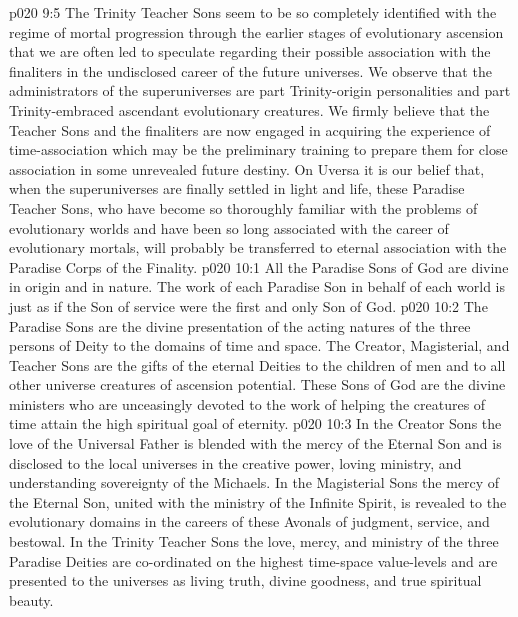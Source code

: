 \pc \vs p020 9:5 The Trinity Teacher Sons seem to be so completely identified with the regime of mortal progression through the earlier stages of evolutionary ascension that we are often led to speculate regarding their possible association with the finaliters in the undisclosed career of the future universes. We observe that the administrators of the superuniverses are part Trinity\hyp{}origin personalities and part Trinity\hyp{}embraced ascendant evolutionary creatures. We firmly believe that the Teacher Sons and the finaliters are now engaged in acquiring the experience of time\hyp{}association which may be the preliminary training to prepare them for close association in some unrevealed future destiny. On Uversa it is our belief that, when the superuniverses are finally settled in light and life, these Paradise Teacher Sons, who have become so thoroughly familiar with the problems of evolutionary worlds and have been so long associated with the career of evolutionary mortals, will probably be transferred to eternal association with the Paradise Corps of the Finality.\plusone
{}
\vs p020 10:1 All the Paradise Sons of God are divine in origin and in nature. The work of each Paradise Son in behalf of each world is just as if the Son of service were the first and only Son of God.
\vs p020 10:2 The Paradise Sons are the divine presentation of the acting natures of the three persons of Deity to the domains of time and space. The Creator, Magisterial, and Teacher Sons are the gifts of the eternal Deities to the children of men and to all other universe creatures of ascension potential. These Sons of God are the divine ministers who are unceasingly devoted to the work of helping the creatures of time attain the high spiritual goal of eternity.
\vs p020 10:3 In the Creator Sons the love of the Universal Father is blended with the mercy of the Eternal Son and is disclosed to the local universes in the creative power, loving ministry, and understanding sovereignty of the Michaels. In the Magisterial Sons the mercy of the Eternal Son, united with the ministry of the Infinite Spirit, is revealed to the evolutionary domains in the careers of these Avonals of judgment, service, and bestowal. In the Trinity Teacher Sons the love, mercy, and ministry of the three Paradise Deities are co\hyp{}ordinated on the highest time\hyp{}space value\hyp{}levels and are presented to the universes as living truth, divine goodness, and true spiritual beauty.
